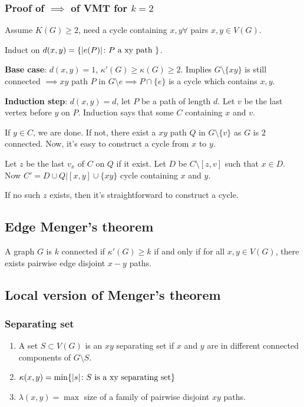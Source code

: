 \documentclass[11pt]{article}
\def\max{\operatorname{max}}
\def\min{\operatorname{min}}
\begin{document}
\subsubsection{Proof of \(\implies\) of VMT for \(k=2\)}
\label{sec:orgf443bff}
Assume \(K(G) \ge 2\), need a cycle containing \(x, y \forall\) pairs \(x, y \in
    V(G)\).

Induct on \(d(x, y) = \{\vert e(P)\vert \colon P \textup{ a xy path }\}\).

\textbf{Base case}: \(d(x, y) = 1\), \(\kappa'(G) \ge \kappa(G) \ge 2\). Implies \(G
    \setminus \{xy\}\) is still connected \(\implies xy\) path \(P\) in \(G\setminus
    e \implies P \cap \{e\}\) is a cycle which contains \(x, y\).

\textbf{Induction step}: \(d(x, y) = d\), let \(P\) be a path of length \(d\). Let \(v\) be
 the last vertex before \(y\) on \(P\). Induction says that some \(C\) containing
 \(x\) and \(v\).

If \(y\in C\), we are done. If not, there exist a \(xy\) path \(Q\) in
\(G\setminus \{v\}\) as \(G\) is \(2\) connected. Now, it's easy to construct a
cycle from \(x\) to \(y\).

Let \(z\) be the last \(v_x\) of \(C\) on \(Q\) if it exist. Let \(D\) be \(C\setminus
     [z, v]\) such that \(x \in D\). Now \(C' = D \cup Q\vert[x, y] \cup \{xy\}\)
cycle containing \(x\) and \(y\).

If no such \(z\) exists, then it's straightforward to construct a cycle.
\subsection{Edge Menger's theorem}
\label{sec:orgc0f6f6b}
A graph \(G\) is \(k\) connected if \(\kappa'(G) \ge k\) if and only if for all \(x,
   y \in V(G)\), there exists pairwise edge disjoint \(x-y\) paths.
\subsection{Local version of Menger's theorem}
\label{sec:org3708e16}
\subsubsection{Separating set}
\label{sec:org5a540da}
\begin{enumerate}
\item A set \(S \subset V(G)\) is an \(xy\) separating set if \(x\) and \(y\) are in
different connected components of \(G\setminus S\).
\item \(\kappa(x, y) = \min\{\vert s \vert \colon S \textup{ is a xy separating set}\}\)
\item \(\lambda(x,y) = \max\) size of a family of pairwise disjoint \(xy\) paths.
\end{enumerate}
\end{document}

